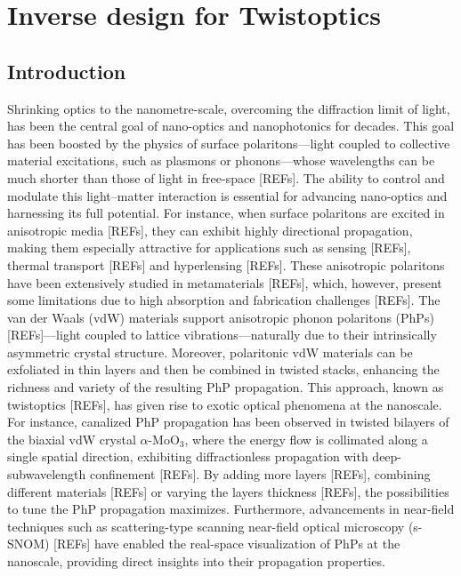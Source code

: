 \chapter{Inverse design for Twistoptics}
\nopagebreak
\label{chap:chapter_5}
\thispagestyle{empty}


\section{Introduction}\label{sec:ch5_intro}

Shrinking optics to the nanometre-scale, overcoming the diffraction limit of light, has been the central goal of nano-optics and nanophotonics for decades. This goal has been boosted by the physics of surface polaritons---light coupled to collective material excitations, such as plasmons or phonons---whose wavelengths can be much shorter than those of light in free-space [REFs]. The ability to control and modulate this light--matter interaction is essential for advancing nano-optics and harnessing its full potential. For instance, when surface polaritons are excited in anisotropic media [REFs], they can exhibit highly directional propagation, making them especially attractive for applications such as sensing [REFs], thermal transport [REFs] and hyperlensing [REFs]. These anisotropic polaritons have been extensively studied in metamaterials [REFs], which, however, present some limitations due to high absorption and fabrication challenges [REFs]. The van der Waals (vdW) materials support anisotropic phonon polaritons (PhPs) [REFs]---light coupled to lattice vibrations---naturally due to their intrinsically asymmetric crystal structure. Moreover, polaritonic vdW materials can be exfoliated in thin layers and then be combined in twisted stacks, enhancing the richness and variety of the resulting PhP propagation. This approach, known as twistoptics [REFs], has given rise to exotic optical phenomena at the nanoscale. For instance, canalized PhP propagation has been observed in twisted bilayers of the biaxial vdW crystal $\alpha\text{-}\mathrm{MoO}_3$, where the energy flow is collimated along a single spatial direction, exhibiting diffractionless propagation with deep-subwavelength confinement [REFs]. By adding more layers [REFs], combining different materials [REFs] or varying the layers thickness [REFs], the possibilities to tune the PhP propagation maximizes. Furthermore, advancements in near-field techniques such as scattering-type scanning near-field optical microscopy (s-SNOM) [REFs] have enabled the real-space visualization of PhPs at the nanoscale, providing direct insights into their propagation properties.

